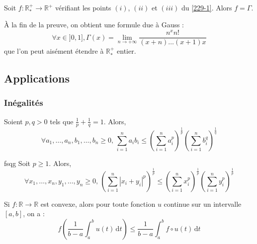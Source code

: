 
	\begin{theorem}
		Soit $f : \mathbb{R}^+_* \rightarrow \mathbb{R}^+$ vérifiant les points $(i)$, $(ii)$ et $(iii)$ du \cref{229-1}. Alors $f = \Gamma$.
	\end{theorem}

	\begin{remark}
		À la fin de la preuve, on obtient une formule due à Gauss :
		\[ \forall x \in ]0, 1], \Gamma(x) = \lim_{n \rightarrow +\infty} \frac{n^x n!}{(x+n) \dots (x+1)x} \]
		que l'on peut aisément étendre à $\mathbb{R}^+_*$ entier.
	\end{remark}

	\subsection{Applications}

	\subsubsection{Inégalités}


	\begin{proposition}
		Soient $p, q > 0$ tels que $\frac{1}{p} + \frac{1}{q} = 1$. Alors,
		\[ \forall a_1, \dots, a_n, b_1, \dots, b_n \geq 0, \, \sum_{i=1}^n a_i b_i \leq \left( \sum_{i=1}^n a_i^p \right)^{\frac{1}{p}} \left( \sum_{i=1}^n b_i^q \right)^{\frac{1}{q}} \]
	\end{proposition}

	\begin{proposition} fsqg
		Soit $p \geq 1$. Alors,
		\[ \forall x_1, \dots, x_n, y_1, \dots, y_n \geq 0, \, \left( \sum_{i=1}^n |x_i + y_i|^p \right)^{\frac{1}{p}} \leq \left( \sum_{i=1}^n x_i^p \right)^{\frac{1}{p}} \left( \sum_{i=1}^n y_i^p \right)^{\frac{1}{p}} \]
	\end{proposition}


	\begin{proposition}
		Si $f : \mathbb{R} \rightarrow \mathbb{R}$ est convexe, alors pour toute fonction $u$ continue sur un intervalle $[a, b]$, on a :
		\[ f \left( \frac{1}{b-a} \int_a^b u(t) \, \mathrm{d}t \right) \leq \frac{1}{b-a} \int_a^b f \circ u (t) \, \mathrm{d}t \]
	\end{proposition}

